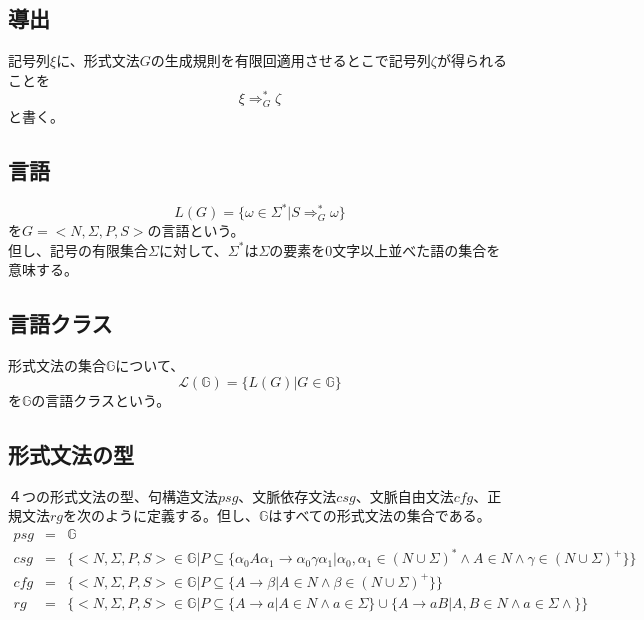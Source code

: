 \documentclass[a4paper]{jarticle}
\begin{document}
\subsection{導出}
記号列$ \xi $に、形式文法$ G $の生成規則を有限回適用させるとこで記号列$ \zeta $が得られることを
\begin{equation}
\xi \Rightarrow _G ^* \zeta
\end{equation}
と書く。
\subsection{言語}
\begin{equation}
L \left( G \right) = \bigl\{ \omega \in \Sigma ^* | S \Rightarrow _G ^* \omega \bigr\}
\end{equation}
を$ G = < N , \Sigma , P , S > $の言語という。\\
但し、記号の有限集合$ \Sigma $に対して、$ \Sigma ^* $は$ \Sigma $の要素を0文字以上並べた語の集合を意味する。
\subsection{言語クラス}
形式文法の集合$ \mathbb{G} $について、
\begin{equation}
\mathcal{L} \left( \mathbb{G} \right) = \bigl\{ L \left( G \right) | G \in \mathbb{G} \bigr\}
\end{equation}
を$ \mathbb{G} $の言語クラスという。
\subsection{形式文法の型}
４つの形式文法の型、句構造文法$psg$、文脈依存文法$csg$、文脈自由文法$cfg$、正規文法$rg$を次のように定義する。但し、$ \mathbb{G} $はすべての形式文法の集合である。
\begin{eqnarray}
psg & = & \mathbb{G} \\
csg & = & \bigl\{ < N , \Sigma , P , S > \in \mathbb{G} | P \subseteq \bigl\{ \alpha _0 A \alpha _1 \to \alpha _0 \gamma \alpha _1 | \alpha _0 , \alpha _1 \in \left( N \cup \Sigma \right) ^* \land A \in N \land \gamma \in \left( N \cup \Sigma \right) ^+ \bigr\} \bigr\} \\
cfg & = & \bigl\{ < N , \Sigma , P , S > \in \mathbb{G} | P \subseteq \bigl\{ A \to \beta | A \in N \land \beta \in \left( N \cup \Sigma \right) ^+ \bigr\} \bigr\} \\
rg & = & \bigl\{ < N , \Sigma , P , S > \in \mathbb{G} | P \subseteq \bigl\{ A \to a | A \in N \land a \in \Sigma \bigr\} \cup \bigl\{ A \to aB | A , B \in N \land a \in \Sigma \land \bigr\} \bigr\}
\end{eqnarray}
\end{document}
